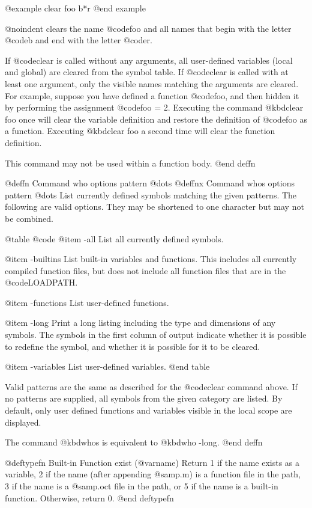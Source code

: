 @example
clear foo b*r
@end example

@noindent
clears the name @code{foo} and all names that begin with the letter
@code{b} and end with the letter @code{r}.

If @code{clear} is called without any arguments, all user-defined
variables (local and global) are cleared from the symbol table.  If
@code{clear} is called with at least one argument, only the visible
names matching the arguments are cleared.  For example, suppose you have
defined a function @code{foo}, and then hidden it by performing the
assignment @code{foo = 2}.  Executing the command @kbd{clear foo} once
will clear the variable definition and restore the definition of
@code{foo} as a function.  Executing @kbd{clear foo} a second time will
clear the function definition.

This command may not be used within a function body.
@end deffn

@deffn {Command} who options pattern @dots{}
@deffnx {Command} whos options pattern @dots{}
List currently defined symbols matching the given patterns.  The
following are valid options.  They may be shortened to one character but
may not be combined.

@table @code
@item -all
List all currently defined symbols.

@item -builtins
List built-in variables and functions.  This includes all currently
compiled function files, but does not include all function files that
are in the @code{LOADPATH}.

@item -functions
List user-defined functions.

@item -long
Print a long listing including the type and dimensions of any symbols.
The symbols in the first column of output indicate whether it is
possible to redefine the symbol, and whether it is possible for it to be
cleared.

@item -variables
List user-defined variables.
@end table

Valid patterns are the same as described for the @code{clear} command
above.  If no patterns are supplied, all symbols from the given category
are listed.  By default, only user defined functions and variables
visible in the local scope are displayed.

The command @kbd{whos} is equivalent to @kbd{who -long}.
@end deffn

@deftypefn {Built-in Function} {} exist (@var{name})
Return 1 if the name exists as a variable, 2 if the name (after
appending @samp{.m}) is a function file in the path, 3 if the name is a
@samp{.oct} file in the path, or 5 if the name is a built-in function.
Otherwise, return 0.
@end deftypefn

